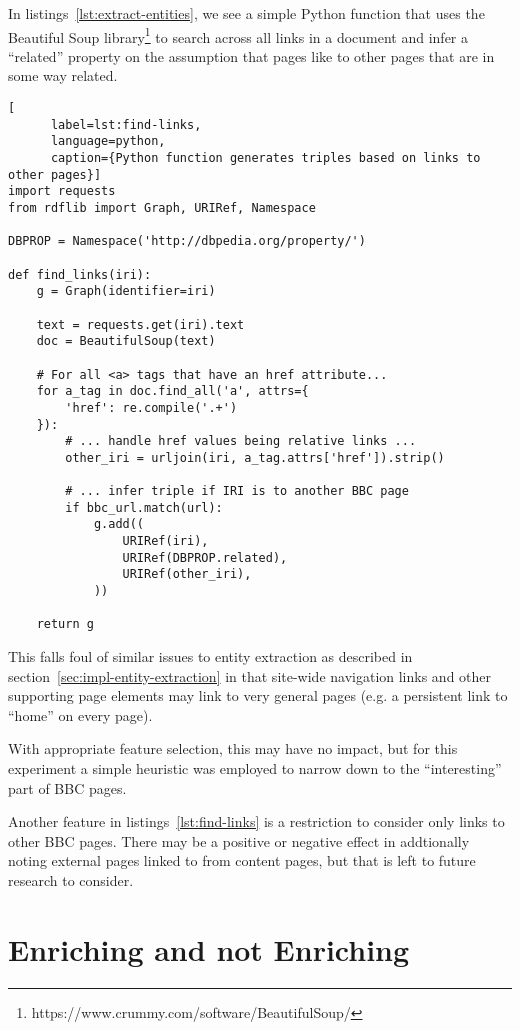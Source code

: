 In listings~\ref{lst:extract-entities}, we see a simple Python
function that uses the Beautiful Soup
library\footnote{https://www.crummy.com/software/BeautifulSoup/} to
search across all links in a document and infer a ``related''
property on the assumption that pages like to other pages that are in
some way related.

\begin{centering}
  \begin{lstlisting}[
      label=lst:find-links,
      language=python,
      caption={Python function generates triples based on links to other pages}]
import requests
from rdflib import Graph, URIRef, Namespace

DBPROP = Namespace('http://dbpedia.org/property/')
    
def find_links(iri):
    g = Graph(identifier=iri)

    text = requests.get(iri).text
    doc = BeautifulSoup(text)

    # For all <a> tags that have an href attribute...
    for a_tag in doc.find_all('a', attrs={
        'href': re.compile('.+')
    }):
        # ... handle href values being relative links ...
        other_iri = urljoin(iri, a_tag.attrs['href']).strip()

        # ... infer triple if IRI is to another BBC page
        if bbc_url.match(url):
            g.add((
                URIRef(iri),
                URIRef(DBPROP.related),
                URIRef(other_iri),
            ))

    return g
  \end{lstlisting}
\end{centering}

This falls foul of similar issues to entity extraction as described
in section~\ref{sec:impl-entity-extraction} in that site-wide
navigation links and other supporting page elements may link to
very general pages (e.g. a persistent link to ``home'' on every page).

With appropriate feature selection, this may have no impact, but for
this experiment a simple heuristic was employed to narrow down to
the ``interesting'' part of BBC pages.

Another feature in listings~\ref{lst:find-links} is a restriction
to consider only links to other BBC pages. There may be a positive
or negative effect in addtionally noting external pages linked to from
content pages, but that is left to future research to consider.

\section{Enriching and not Enriching}

